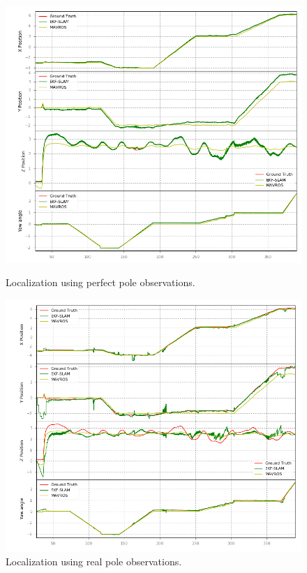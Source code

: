 \begin{figure}
    \centering
    \includegraphics[width=\textwidth]{Images/fig20-exp-a1}
    \caption{Localization using perfect pole observations.}
    \label{fig:chapter3:simulation:experimentsA:a}
    \centering
    \includegraphics[width=\textwidth]{Images/fig20-exp-a2}
    \caption{Localization using real pole observations.}
    \label{fig:chapter3:simulation:experimentsA:b}
\end{figure}

